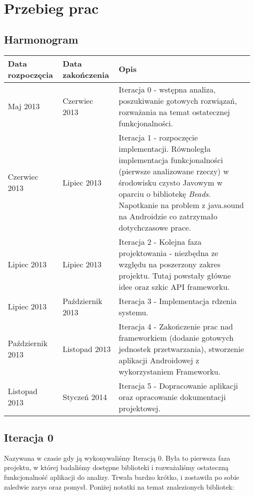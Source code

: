 \chapter{Przebieg prac}

\section{Harmonogram}

\begin{center}
    \begin{tabular}{| l | l | p{9cm} |}
    \hline
    Data rozpoczęcia & Data zakończenia & Opis \\ \hline
    Maj 2013 & Czerwiec 2013 & Iteracja 0 - wstępna analiza, poszukiwanie gotowych rozwiązań, rozważania na temat ostatecznej funkcjonalności. \\ \hline
    Czerwiec 2013 & Lipiec 2013 & Iteracja 1 - rozpoczęcie implementacji. Równoległa implementacja funkcjonalności (pierwsze analizowane rzeczy) w środowisku czysto Javowym w oparciu o bibliotekę \emph{Beads}. Napotkanie na problem z java.sound na Androidzie co zatrzymało dotychczasowe prace. \\ \hline
    Lipiec 2013 & Lipiec 2013 & Iteracja 2 - Kolejna faza projektowania - niezbędna ze względu na poszerzony zakres projektu. Tutaj powstały główne idee oraz szkic API frameworku.  \\ \hline
    Lipiec 2013 & Październik 2013 & Iteracja 3 - Implementacja rdzenia systemu. \\ \hline
    Październik 2013 & Listopad 2013 & Iteracja 4 - Zakończenie prac nad frameworkiem (dodanie gotowych jednostek przetwarzania), stworzenie aplikacji Androidowej z wykorzystaniem Frameworku. \\ \hline
    Listopad 2013 & Styczeń 2014 & Iteracja 5 - Dopracowanie aplikacji oraz opracowanie dokumentacji projektowej. \\ \hline
    \end{tabular}
\end{center}


\section{Iteracja 0}
Nazywana w czasie gdy ją wykonywaliśmy Iteracją 0. Była to pierwsza faza projektu, w której badaliśmy dostępne biblioteki i rozważaliśmy ostateczną funkcjonalność aplikacji do analizy. Trwała bardzo krótko, i zostawiła po sobie zaledwie zarys oraz pomysł. Poniżej notatki na temat znalezionych bibliotek:

